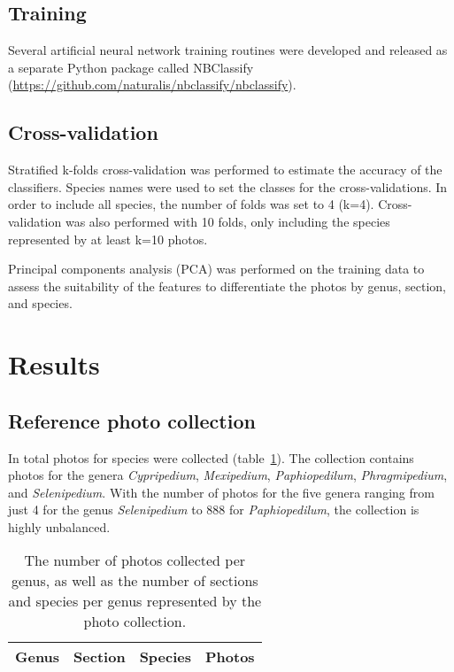 \documentclass[3p,twocolumn,10pt]{elsarticle}
\begin{document}
\subsection{Training}

Several artificial neural network training routines were developed and released as a separate Python package called NBClassify (\url{https://github.com/naturalis/nbclassify/nbclassify}).

\subsection{Cross-validation}

Stratified k-folds cross-validation was performed to estimate the accuracy of the classifiers. Species names were used to set the classes for the cross-validations. In order to include all species, the number of folds was set to 4 (k=4). Cross-validation was also performed with 10 folds, only including the species represented by at least k=10 photos.

Principal components analysis (PCA) was performed on the training data to assess the suitability of the features to differentiate the photos by genus, section, and species.

\section{Results}
\label{sect:results}

\subsection{Reference photo collection}

In total {\PhotoCount} photos for {\SpeciesCount} species were collected (table~\ref{tbl:photo-counts}). The collection contains photos for the genera \textit{Cypripedium}, \textit{Mexipedium}, \textit{Paphiopedilum}, \textit{Phragmipedium}, and \textit{Selenipedium}. With the number of photos for the five genera ranging from just 4 for the genus \textit{Selenipedium} to 888 for \textit{Paphiopedilum}, the collection is highly unbalanced.

\begin{table}[h]\footnotesize
    \caption{The number of photos collected per genus, as well as the number of sections and species per genus represented by the photo collection.}
    \begin{center}
    \begin{tabular}{llll}
    \toprule
    \textbf{Genus} & \textbf{Section} & \textbf{Species} & \textbf{Photos} \\
    \midrule
    
    \bottomrule
    \end{tabular}
    \end{center}
    \label{tbl:photo-counts}
\end{table}
\end{document}
